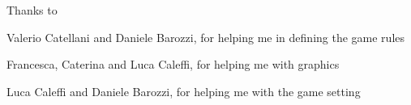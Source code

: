 \ringraziamenti
Thanks to

Valerio Catellani and Daniele Barozzi, for helping me in defining the game rules

Francesca, Caterina and Luca Caleffi, for helping me with graphics

Luca Caleffi and Daniele Barozzi, for helping me with the game setting